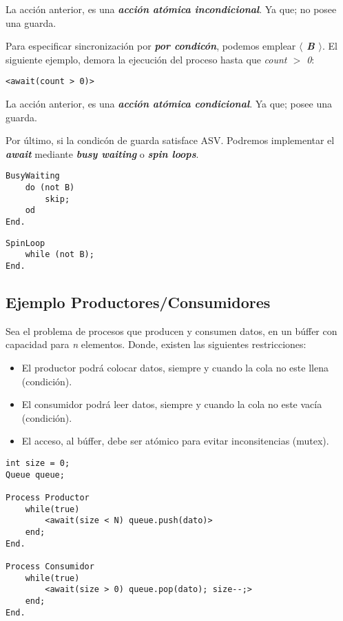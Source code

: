 \documentclass[a4paper, 10pt]{report}
\begin{document}
La acción anterior, es una \textbf{\emph{acción atómica incondicional}}. Ya que; no posee una guarda.

Para especificar sincronización por \textbf{\emph{por condicón}}, podemos emplear \textbf{\emph{$\langle$ B $\rangle$}}. El siguiente ejemplo, demora la ejecución del proceso hasta que \emph{count $>$ 0}:

\begin{lstlisting}
<await(count > 0)>
\end{lstlisting}
    

La acción anterior, es una \textbf{\emph{acción atómica condicional}}. Ya que; posee una guarda.

Por último, si la condicón de guarda satisface ASV. Podremos implementar el \textbf{\emph{await}} mediante \textbf{\emph{busy waiting}} o \textbf{\emph{spin loops}}.

\begin{multicols}{2}
\begin{lstlisting}
BusyWaiting
    do (not B)
        skip;
    od
End.
\end{lstlisting}
\columnbreak
\begin{lstlisting}
SpinLoop
    while (not B);
End.
\end{lstlisting}
\end{multicols}

\subsection{Ejemplo Productores/Consumidores}

Sea el problema de procesos que producen y consumen datos, en un búffer con capacidad para \emph{n} elementos. Donde, existen las siguientes restricciones:

\begin{itemize}
    \item El productor podrá colocar datos, siempre y cuando la cola no este llena (condición).
    \item El consumidor podrá leer datos, siempre y cuando la cola no este vacía (condición).
    \item El acceso, al búffer, debe ser atómico para evitar inconsitencias (mutex).
\end{itemize}

\begin{lstlisting}
int size = 0;
Queue queue;
    
Process Productor
    while(true)
        <await(size < N) queue.push(dato)>
    end;
End.

Process Consumidor
    while(true)
        <await(size > 0) queue.pop(dato); size--;>
    end;
End.
\end{lstlisting}
\end{document}
